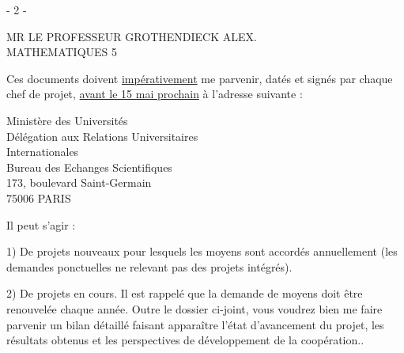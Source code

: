 
\begin{center}- 2 -\end{center}
\begin{flushright}
MR LE PROFESSEUR GROTHENDIECK ALEX.\\
MATHEMATIQUES \hfill 5
\end{flushright}

Ces documents doivent \uline{impérativement} me parvenir, datés et signés par chaque chef de projet, \uline{avant le 15 mai prochain} à l'adresse suivante :

\begin{center}
Ministère des Universités\\
Délégation aux Relations Universitaires\\
Internationales\\
Bureau des Echanges Scientifiques\\
173, boulevard Saint-Germain\\
75006 PARIS
\end{center}

Il peut s'agir :

1) De projets nouveaux pour lesquels les moyens sont accordés annuellement (les demandes ponctuelles ne relevant pas des projets intégrés).

2) De projets en cours. Il est rappelé que la demande de moyens doit être renouvelée chaque année. Outre le dossier ci-joint, vous voudrez bien me faire parvenir un bilan détaillé faisant apparaître l'état d'avancement du projet, les résultats obtenus et les perspectives de développement de la coopération..

